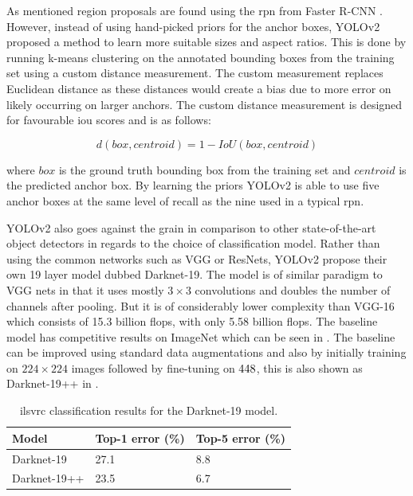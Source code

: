 As mentioned region proposals are found using the \gls{rpn} from Faster R-CNN \cite{fasterrcnn}. However, instead of using hand-picked priors for the anchor boxes, YOLOv2 proposed a method to learn more suitable sizes and aspect ratios. This is done by running k-means clustering on the annotated bounding boxes from the training set using a custom distance measurement. The custom measurement replaces Euclidean distance as these distances would create a bias due to more error on likely occurring on larger anchors. The custom distance measurement is designed for favourable \gls{iou} scores and is as follows:

\begin{equation}
  d(box, centroid) = 1 - IoU(box, centroid)
\end{equation}

where $box$ is the ground truth bounding box from the training set and $centroid$ is the predicted anchor box. By learning the priors YOLOv2 is able to use five anchor boxes at the same level of recall as the nine used in a typical \gls{rpn}.

YOLOv2 also goes against the grain in comparison to other state-of-the-art object detectors in regards to the choice of classification model. Rather than using the common networks such as VGG or ResNets, YOLOv2 propose their own 19 layer model dubbed Darknet-19. The model is of similar paradigm to VGG nets in that it uses mostly $3 \times 3$ convolutions and doubles the number of channels after pooling. But it is of considerably lower complexity than VGG-16 which consists of 15.3 billion \gls{flops}, with only 5.58 billion \gls{flops}. The baseline model has competitive results on ImageNet which can be seen in . The baseline can be improved using standard data augmentations and also by initially training on $224 \times 224$ images followed by fine-tuning on $448 \time 448$, this is also shown as Darknet-19++ in .

\begin{table}[h]
\centering
\caption{\gls{ilsvrc} classification results for the Darknet-19 model.}
\label{tab:darknetimagenet}
\begin{tabular}{|l|l|l|}
\hline
\textbf{Model}                                                                                       & \textbf{Top-1 error (\%)} & \textbf{Top-5 error (\%)} \\ \hline
Darknet-19                                                                                  & 27.1             & 8.8              \\ \hline
Darknet-19++ & 23.5             & 6.7              \\ \hline
\end{tabular}
\end{table}

